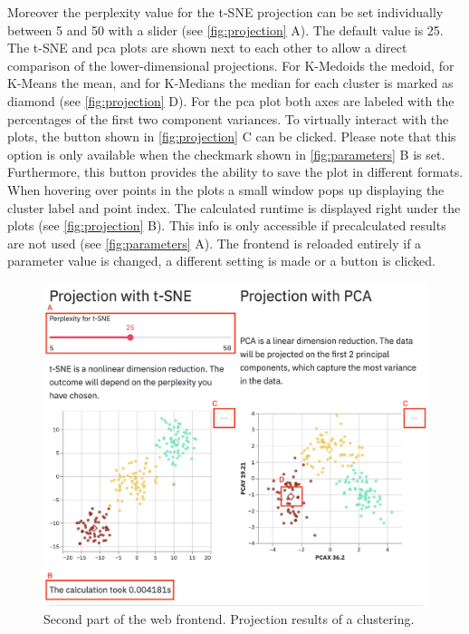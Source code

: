 Moreover the perplexity value for the \acrshort{t-SNE} projection can be set individually between 5 and 50 with a slider (see \autoref{fig:projection} A). The default value is 25. The \acrshort{t-SNE} and \acrshort{pca} plots are shown next to each other to allow a direct comparison of the lower-dimensional projections. For K-Medoids the medoid, for K-Means the mean, and for K-Medians the median for each cluster is marked as diamond (see \autoref{fig:projection} D). For the \acrshort{pca} plot both axes are labeled with the percentages of the first two component variances. To virtually interact with the plots, the button shown in \autoref{fig:projection} C can be clicked. Please note that this option is only available when the checkmark shown in \autoref{fig:parameters} B is set. Furthermore, this button provides the ability to save the plot in different formats.
When hovering over points in the plots a small window pops up displaying the cluster label and point index.
The calculated runtime is displayed right under the plots (see \autoref{fig:projection} B). This info is only accessible if precalculated results are not used (see \autoref{fig:parameters} A).
The frontend is reloaded entirely if a parameter value is changed, a different setting is made or a button is clicked. 
\begin{figure}[H]
	\centering
	\includegraphics[width=\linewidth]{modules/web_frontend/projection_letters}
	\caption{Second part of the web frontend. Projection results of a clustering.}\label{fig:projection}
\end{figure}

